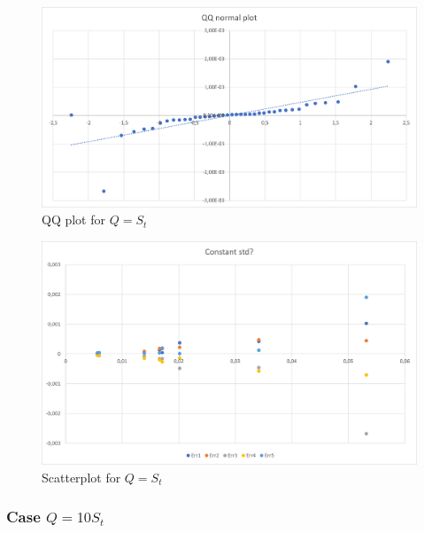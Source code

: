 \documentclass{article}
\begin{document}
                \begin{figure}[htbp]
                    \centering
                    \includegraphics[scale=0.6]{images/QQplot_1.png}
                    \caption{QQ plot for $Q = S_t$}
                    \label{fig:QQplot_1}
                \end{figure}
                
                \begin{figure}[htbp]
                    \centering
                    \includegraphics[scale=0.6]{images/standardDeviation_1.png}
                    \caption{Scatterplot for $Q = S_t$}
                    \label{fig:standardDeviation_1}
                \end{figure}
        
        \newpage
            \subsubsection{Case $Q = 10 S_t$}
        
\end{document}
